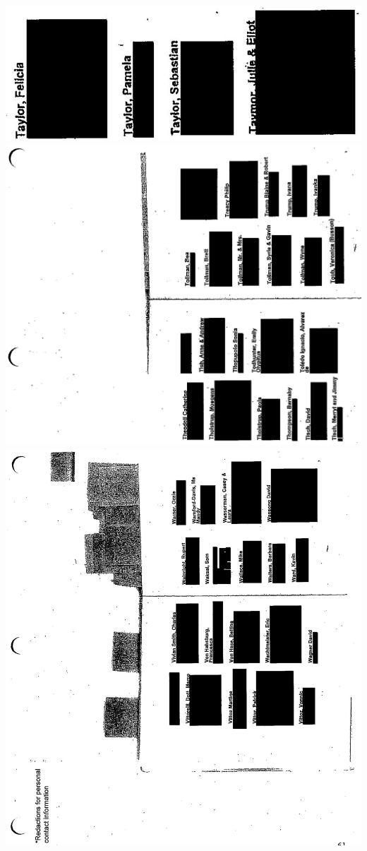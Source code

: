 \documentclass[10pt]{article}
\begin{document}
\includegraphics[max width=\textwidth, center]{2025_02_27_dd68c3d38de88f0516d9g-175(1)}\\
\includegraphics[max width=\textwidth, center]{2025_02_27_dd68c3d38de88f0516d9g-176}\\
\includegraphics[max width=\textwidth, center]{2025_02_27_dd68c3d38de88f0516d9g-178}\\
\end{document}
